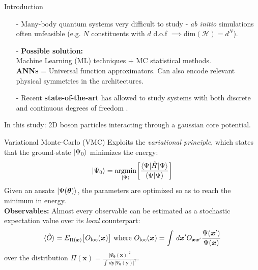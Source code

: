 \documentclass{beamer}
\DeclareMathOperator*{\argmin}{argmin}
\begin{document}
\begin{frame}{Introduction}
\begin{itemize}
\item[-]Many-body quantum systems very difficult to study - \textit{ab initio} simulations often 
unfeasible (e.g. $N$ constituents with $d$ d.o.f $\implies \text{dim}(\mathcal{H}) = d^N$). \\
\vspace{0.5cm}
\item[-]\textbf{Possible solution:} \\
Machine Learning (ML) techniques + MC statistical methods. \\
\textbf{ANNs} = Universal function approximators. Can also encode relevant physical symmetries in the architectures. \\
\vspace{0.5cm}
\item[-]Recent \textbf{state-of-the-art} has allowed to study systems with both discrete and continuous degrees of freedom \cite{carleo_2017, hibat-allah_2020, choo_2018,pescia_2022, pescia_2023, pfau_2020}. \\
\end{itemize}
\vspace{0.5cm}
In this study: 2D boson particles interacting through a gaussian core potential.
\end{frame}


\begin{frame}{Variational Monte-Carlo (VMC)}
Exploits the \textit{variational principle}, which states that the ground-state $\ket{\Psi_0}$ minimizes 
the energy:
\begin{equation*}
  \ket{\Psi_0} = \argmin_{\ket{\Psi}}\biggr[\dfrac{\braket{\Psi|\hat{H}|
  \Psi}}{\braket{\Psi|\Psi}}\biggr]
\end{equation*}
Given an ansatz $\ket{\Psi(\bm{\theta})}$, the parameters are optimized so as to reach the minimum in 
energy.\\
\textbf{Observables:} Almost every observable can be estimated as a stochastic expectation value over its 
\textit{local} counterpart:
\begin{equation*}
\braket{\hat{O}} = E_{\Pi(\bm{x})}\big[O_{\text{loc}}(\bm{x})\big]\text{   where   }
O_\text{loc}(\bm{x}) = \int \,d\bm{x}' O_{\bm{xx}'} \dfrac{\Psi(\bm{x}')}{\Psi(\bm{x})}
\end{equation*}
over the distribution $\Pi(\bm{x}) = \frac{|\Psi_{\bm{\theta}}(\bm{x})|^2}{\int \,d\bm{y} |\Psi_{\bm{\theta}}(\bm{y})|^2}$.
\end{frame}
  
\end{document}
